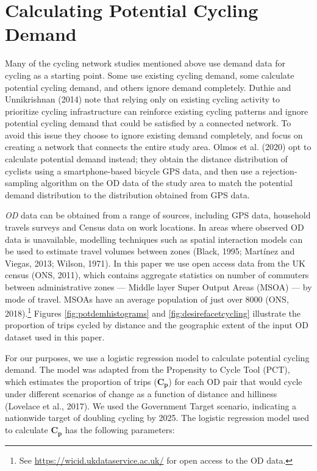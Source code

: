 \documentclass[
]{article}
\begin{document}
\hypertarget{calculating-potential-cycling-demand}{%
\section{Calculating Potential Cycling Demand}\label{calculating-potential-cycling-demand}}

Many of the cycling network studies mentioned above use demand data for cycling as a starting point.
Some use existing cycling demand, some calculate potential cycling demand, and others ignore demand completely.
Duthie and Unnikrishnan (2014) note that relying only on existing cycling activity to prioritize cycling
infrastructure can reinforce existing cycling patterns and ignore potential cycling demand that could be satisfied by a connected network.
To avoid this issue they choose to ignore existing demand completely, and focus on creating a network that connects the
entire study area.
Olmos et al. (2020) opt to calculate potential demand instead; they obtain the distance distribution of cyclists using a smartphone-based bicycle GPS data, and then use a rejection-sampling algorithm on the OD data of the study area to match
the potential demand distribution to the distribution obtained from GPS data.

\emph{OD} data can be obtained from a range of sources,
including GPS data, household travels surveys and Census data on work
locations. In areas where observed OD data is unavailable, modelling
techniques such as spatial interaction models can be used to estimate
travel volumes between zones (Black, 1995; Martínez and Viegas, 2013; Wilson, 1971). In this paper we use open access data from the UK
census (ONS, 2011), which contains aggregate statistics on
number of commuters between administrative zones --- Middle layer Super
Output Areas (MSOA) --- by mode of travel. MSOAs have an average
population of just over 8000 (ONS, 2018).\footnote{ See
  \url{https://wicid.ukdataservice.ac.uk/} for open access to the OD data.}
Figures \ref{fig:potdemhistograms} and \ref{fig:desirefacetcycling}
illustrate the proportion of trips cycled by distance and the
geographic extent of the input OD dataset used in this paper.

For our purposes, we use a logistic regression model to calculate
potential cycling demand. The model was adapted from the Propensity to
Cycle Tool (PCT), which estimates the proportion of trips
(\(\boldsymbol{C_{p}}\)) for each OD pair that would cycle under
different scenarios of change as a
function of distance and hilliness (Lovelace et al., 2017). We used the Government Target scenario,
indicating a nationwide target of doubling cycling by 2025. The
logistic regression model used to calculate \(\boldsymbol{C_{p}}\) has
the following parameters:
\end{document}
